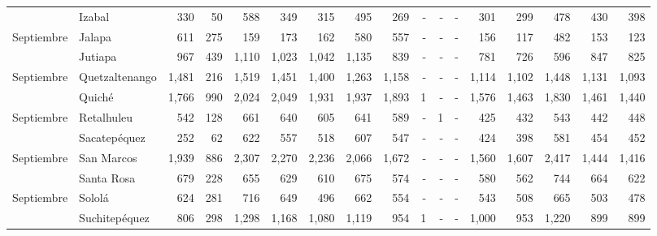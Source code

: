 \begin{landscape}
\begin{center}
\begin{longtable}{llrrrrrrrrrrrrrrr}
\rowcolor{color1!5!white}\multicolumn{1}{l}{	\footnotesize	 Septiembre 	}&	 Izabal 	&	 330 	&	 50 	&	 588 	&	 349 	&	 315 	&	 495 	&	 269 	&	 -   	&	 -   	&	 -   	&	 301 	&	 299 	&	 478 	&	 430 	&	 398 	\\
\multicolumn{1}{l}{	\footnotesize	 Septiembre 	}&	 Jalapa 	&	 611 	&	 275 	&	 159 	&	 173 	&	 162 	&	 580 	&	 557 	&	 -   	&	 -   	&	 -   	&	 156 	&	 117 	&	 482 	&	 153 	&	 123 	\\
\rowcolor{color1!5!white}\multicolumn{1}{l}{	\footnotesize	 Septiembre 	}&	 Jutiapa 	&	 967 	&	 439 	&	 1,110 	&	 1,023 	&	 1,042 	&	 1,135 	&	 839 	&	 -   	&	 -   	&	 -   	&	 781 	&	 726 	&	 596 	&	 847 	&	 825 	\\
\multicolumn{1}{l}{	\footnotesize	 Septiembre 	}&	 Quetzaltenango 	&	 1,481 	&	 216 	&	 1,519 	&	 1,451 	&	 1,400 	&	 1,263 	&	 1,158 	&	 -   	&	 -   	&	 -   	&	 1,114 	&	 1,102 	&	 1,448 	&	 1,131 	&	 1,093 	\\
\rowcolor{color1!5!white}\multicolumn{1}{l}{	\footnotesize	 Septiembre 	}&	 Quiché 	&	 1,766 	&	 990 	&	 2,024 	&	 2,049 	&	 1,931 	&	 1,937 	&	 1,893 	&	 1 	&	 -   	&	 -   	&	 1,576 	&	 1,463 	&	 1,830 	&	 1,461 	&	 1,440 	\\
\multicolumn{1}{l}{	\footnotesize	 Septiembre 	}&	 Retalhuleu 	&	 542 	&	 128 	&	 661 	&	 640 	&	 605 	&	 641 	&	 589 	&	 -   	&	 1 	&	 -   	&	 425 	&	 432 	&	 543 	&	 442 	&	 448 	\\
\rowcolor{color1!5!white}\multicolumn{1}{l}{	\footnotesize	 Septiembre 	}&	 Sacatepéquez 	&	 252 	&	 62 	&	 622 	&	 557 	&	 518 	&	 607 	&	 547 	&	 -   	&	 -   	&	 -   	&	 424 	&	 398 	&	 581 	&	 454 	&	 452 	\\
\multicolumn{1}{l}{	\footnotesize	 Septiembre 	}&	 San Marcos 	&	 1,939 	&	 886 	&	 2,307 	&	 2,270 	&	 2,236 	&	 2,066 	&	 1,672 	&	 -   	&	 -   	&	 -   	&	 1,560 	&	 1,607 	&	 2,417 	&	 1,444 	&	 1,416 	\\
\rowcolor{color1!5!white}\multicolumn{1}{l}{	\footnotesize	 Septiembre 	}&	 Santa Rosa 	&	 679 	&	 228 	&	 655 	&	 629 	&	 610 	&	 675 	&	 574 	&	 -   	&	 -   	&	 -   	&	 580 	&	 562 	&	 744 	&	 664 	&	 622 	\\
\multicolumn{1}{l}{	\footnotesize	 Septiembre 	}&	 Sololá 	&	 624 	&	 281 	&	 716 	&	 649 	&	 496 	&	 662 	&	 554 	&	 -   	&	 -   	&	 -   	&	 543 	&	 508 	&	 665 	&	 503 	&	 478 	\\
\rowcolor{color1!5!white}\multicolumn{1}{l}{	\footnotesize	 Septiembre 	}&	 Suchitepéquez 	&	 806 	&	 298 	&	 1,298 	&	 1,168 	&	 1,080 	&	 1,119 	&	 954 	&	 1 	&	 -   	&	 -   	&	 1,000 	&	 953 	&	 1,220 	&	 899 	&	 899 	\\

\end{longtable}
\end{center}
\end{landscape}
